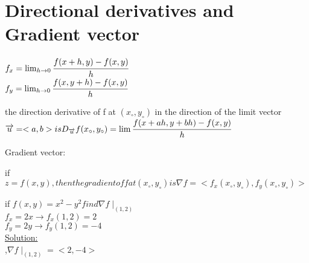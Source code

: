 \section{Directional derivatives and Gradient vector}
$f_x=\lim_{h\to0} \cfrac{f(x+h,y)-f(x,y) }{h}$\\
$f_y = \lim_{h \to 0} \cfrac{f(x,y+h) - f(x,y)}{h}$\\
\noindent{\color{smalt(darkpowderblue)}\rule{\linewidth}{.2mm}}

\begin{definition}
the direction derivative of f at $(x_\circ , y_\circ)$ in the direction of the limit vector ${\overrightarrow{u}} = <a,b> is D_{\overrightarrow{u}} f(x_\circ,y_\circ)=\lim\cfrac{f(x+a h,y+b h) - f(x,y)}{h}$
\end{definition} 

Gradient vector:\\
\begin{definition}
if $z = f(x,y) , then the gradient of f at (x_\circ,y_\circ) is \nabla f = < f_x (x_\circ ,y_\circ),f_y(x_\circ , y_\circ)>$
\end{definition}
\noindent{\color{smalt(darkpowderblue)}\rule{\linewidth}{.2mm}}
\begin{example}
if $ f(x,y) = x^{2} - y^{2} find \nabla f\mid_(1,2)$\\
$f_x = 2x \rightarrow f_x(1,2) = 2 $\\
$f_y = 2y \rightarrow f_y(1,2) = -4$\\
{\color{smalt(darkpowderblue)}\underline{Solution:}}\\,$\nabla f\mid_(1,2) = <2,-4>$
\end{example}

